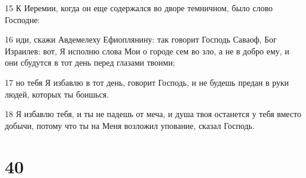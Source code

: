 \par 15 К Иеремии, когда он еще содержался во дворе темничном, было слово Господне:
\par 16 иди, скажи Авдемелеху Ефиоплянину: так говорит Господь Саваоф, Бог Израилев: вот, Я исполню слова Мои о городе сем во зло, а не в добро ему, и они сбудутся в тот день перед глазами твоими;
\par 17 но тебя Я избавлю в тот день, говорит Господь, и не будешь предан в руки людей, которых ты боишься.
\par 18 Я избавлю тебя, и ты не падешь от меча, и душа твоя останется у тебя вместо добычи, потому что ты на Меня возложил упование, сказал Господь.

\chapter{40}

